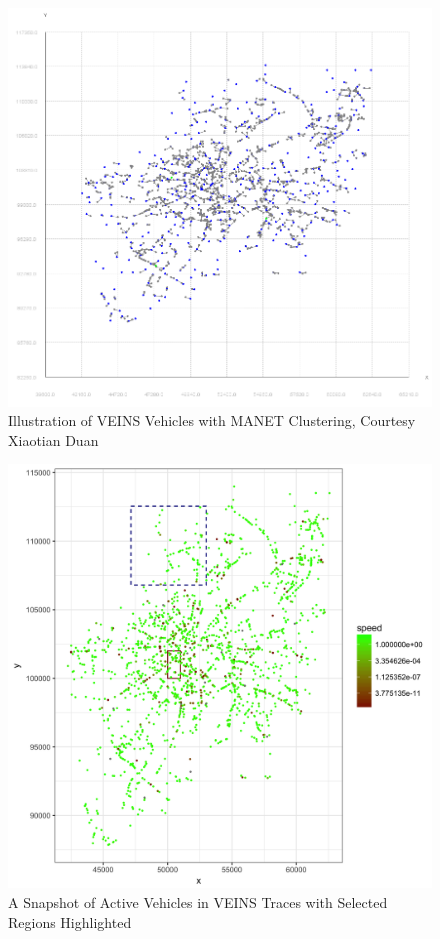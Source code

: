 \documentclass{thesis}
\begin{document}
    \begin{figure}
        \centering
        \includegraphics[scale=.5]{binImages/xiaotian-clusters.png}
        \caption{Illustration of VEINS Vehicles with MANET Clustering, Courtesy Xiaotian Duan}
        \label{fig:clusters}
    \end{figure}
    \begin{figure}
        \centering
        \includegraphics[scale=.2]{binImages/cars.png}
        \caption{A Snapshot of Active Vehicles in VEINS Traces with Selected Regions Highlighted}
        \label{fig:regions}
    \end{figure}
\end{document}
